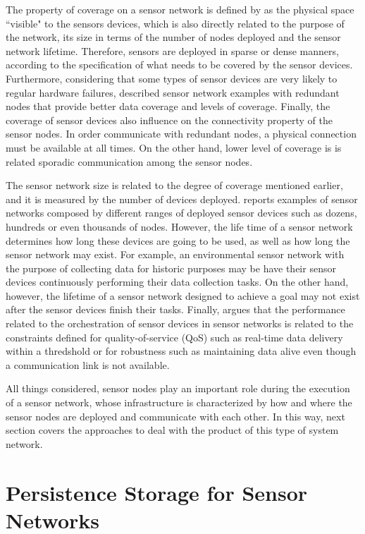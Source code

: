 The property of coverage on a sensor network is defined by
\cite{sn-intro01} as the physical space ``visible" to the sensors devices, which
is also directly related to the purpose of the network, its size in terms of
the number of nodes deployed and the sensor network lifetime. Therefore,
sensors are deployed in sparse or dense manners, according to the
specification of what needs to be covered by the sensor devices. Furthermore,
considering that some types of sensor devices are very likely to regular
hardware failures, \cite{sn-intro2} described sensor network examples with 
redundant nodes that provide better data coverage and levels of coverage.
Finally, the coverage of sensor devices also influence on the connectivity
property of the sensor nodes. In order communicate with redundant nodes, a
physical connection must be available at all times. On the other hand, lower
level of coverage is is related sporadic communication among the sensor nodes.

The sensor network size is related to the degree of coverage mentioned earlier,
and it is measured by the number of devices deployed. \cite{sn-intro01}
reports examples of sensor networks composed by different ranges of deployed
sensor devices such as dozens, hundreds or even thousands of nodes. However,
the life time of a sensor network determines how long these devices are going
to be used, as well as how long the sensor network may exist. For example, an
environmental sensor network \cite{sn-ex01} with the purpose of collecting data
for historic purposes may be have their sensor devices continuously performing
their data collection tasks. On the other hand, however, the lifetime of a
sensor network designed to achieve a goal may not exist after the sensor
devices finish their tasks. Finally, \cite{sn-intro02} argues that the
performance related to the orchestration of sensor devices in sensor networks
is related to the constraints defined for quality-of-service (QoS) such as
real-time data delivery within a thredshold or for robustness such as
maintaining data alive even though a communication link is not available.

All things considered, sensor nodes play an important role during the execution
of a sensor network, whose infrastructure is characterized by how and where the
sensor nodes are deployed and communicate with each other. In this way, next
section covers the approaches to deal with the product of this type of system
network.

\section{Persistence Storage for Sensor Networks}

